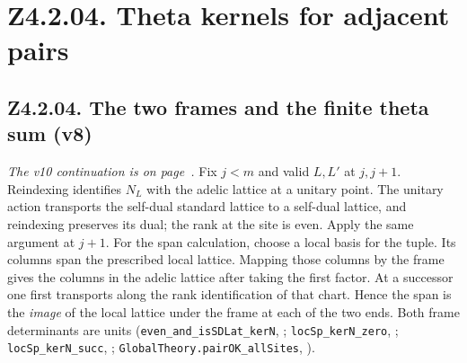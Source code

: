 \section*{Z4.2.04. Theta kernels for adjacent pairs}

\subsection{Z4.2.04. The two frames and the finite theta sum (v8)}\label{r6:Z4.2.04}
\emph{The v10 continuation is on page~\pageref{r8:Z4.2.04}.}
Fix \(j<m\) and valid \(L,L'\) at \(j,j+1\). Reindexing identifies \(N_L\) with the adelic lattice at a unitary point. The unitary action transports the self-dual standard lattice to a self-dual lattice, and reindexing preserves its dual; the rank at the site is even. Apply the same argument at \(j+1\). For the span calculation, choose a local basis for the tuple. Its columns span the prescribed local lattice. Mapping those columns by the frame gives the columns in the adelic lattice after taking the first factor. At a successor one first transports along the rank identification of that chart. Hence the span is the \emph{image} of the local lattice under the frame at each of the two ends. Both frame determinants are units (\nolinkurl{even_and_isSDLat_kerN}, ; \nolinkurl{locSp_kerN_zero}, ; \nolinkurl{locSp_kerN_succ}, ; \nolinkurl{GlobalTheory.pairOK_allSites}, ).

